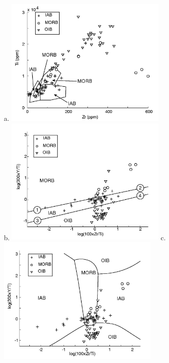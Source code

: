 \begin{figure}[htbp]
  \centering
a.  \includegraphics[width=300]{figures/PearceTiZr.jpg}\\
b.  \includegraphics[width=300]{figures/log_Ti_Zr_lin.jpg}
c.  \includegraphics[width=300]{figures/log_Ti_Zr_q.jpg}

\end{figure}
